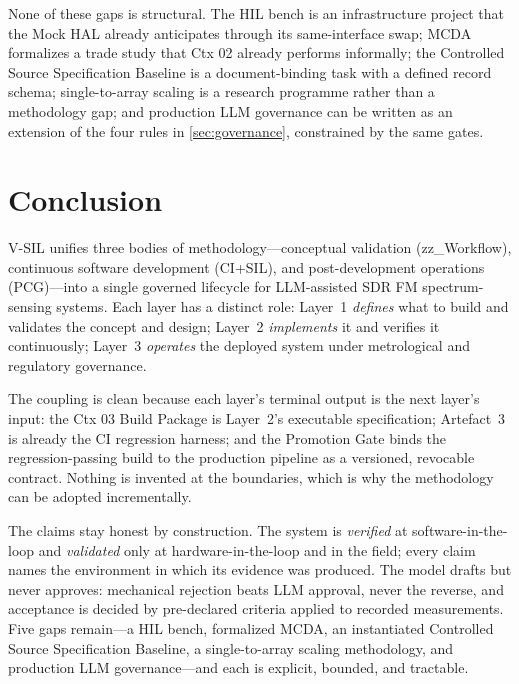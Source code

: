 \documentclass[11pt,a4paper]{article}
\newcommand{\verified}{\emph{verified}}
\newcommand{\validated}{\emph{validated}}
\begin{document}
None of these gaps is structural. The HIL bench is an infrastructure project that the Mock HAL
already anticipates through its same-interface swap; MCDA formalizes a trade study that Ctx 02
already performs informally; the Controlled Source Specification Baseline is a document-binding
task with a defined record schema; single-to-array scaling is a research programme rather than a
methodology gap; and production LLM governance can be written as an extension of the four rules
in \cref{sec:governance}, constrained by the same gates.

\section{Conclusion}
\label{sec:conclusion}

V-SIL unifies three bodies of methodology---conceptual validation (zz\_Workflow), continuous
software development (CI+SIL), and post-development operations (PCG)---into a single governed
lifecycle for LLM-assisted SDR FM spectrum-sensing systems. Each layer has a distinct role:
Layer~1 \emph{defines} what to build and validates the concept and design; Layer~2
\emph{implements} it and verifies it continuously; Layer~3 \emph{operates} the deployed system
under metrological and regulatory governance.

The coupling is clean because each layer's terminal output is the next layer's input: the Ctx 03
Build Package is Layer~2's executable specification; Artefact~3 is already the CI regression
harness; and the Promotion Gate binds the regression-passing build to the production pipeline as
a versioned, revocable contract. Nothing is invented at the boundaries, which is why the
methodology can be adopted incrementally.

The claims stay honest by construction. The system is \verified{} at software-in-the-loop and
\validated{} only at hardware-in-the-loop and in the field; every claim names the environment in
which its evidence was produced. The model drafts but never approves: mechanical rejection beats
LLM approval, never the reverse, and acceptance is decided by pre-declared criteria applied to
recorded measurements. Five gaps remain---a HIL bench, formalized MCDA, an instantiated Controlled
Source Specification Baseline, a single-to-array scaling methodology, and production LLM
governance---and each is explicit, bounded, and tractable.

\appendix
\end{document}
